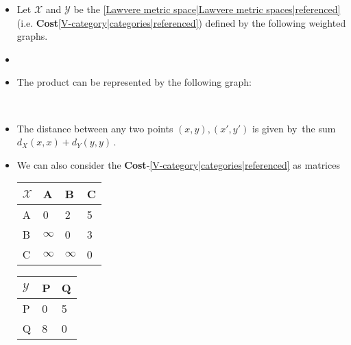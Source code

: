 
\begin{itemize}
    \item Let $\mathcal{X}$ and $\mathcal{Y}$ be the \ref{Lawvere metric space|Lawvere metric spaces|referenced} (i.e. \textbf{Cost}\ref{V-category|categories|referenced}) defined by the following weighted graphs.
    \item {}
    \item The product can be represented by the following graph: \,\,
    \item The distance between any two points $(x,y),(x',y')$ is given by \,the sum $d_X(x,x)+d_Y(y,y)$\,.

    \item We can also consider the \textbf{Cost}-\ref{V-category|categories|referenced} as matrices

          \begin{minipage}{0.48\textwidth}
            \begin{tabular}{|l|l|l|l|}
              \hline
              $\mathcal{X}$ & A        & B        & C \\ \hline
              A             & 0        & 2        & 5 \\ \hline
              B             & $\infty$ & 0        & 3 \\ \hline
              C             & $\infty$ & $\infty$ & 0 \\ \hline
            \end{tabular}
          \end{minipage}

          \begin{minipage}{0.48\textwidth}

            \begin{tabular}{|l|l|l|}
              \hline
              $\mathcal{Y}$ & P & Q \\ \hline
              P             & 0 & 5 \\ \hline
              Q             & 8 & 0 \\ \hline
            \end{tabular}
          \end{minipage}


\end{itemize}
